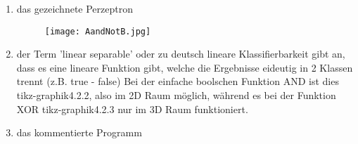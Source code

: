 \begin{enumerate}

	\item das gezeichnete Perzeptron
	\begin{figure}[h]
		\centering
		\texttt{[image: AandNotB.jpg]}
	\end{figure}

	\item der Term 'linear separable' oder zu deutsch lineare Klassifierbarkeit gibt an, dass es eine lineare Funktion gibt, welche die Ergebnisse eideutig in 2 Klassen trennt (z.B. true - false)
		Bei der einfache boolschen Funktion AND ist dies tikz-graphik4.2.2, also im 2D Raum möglich, während es bei der Funktion XOR tikz-graphik4.2.3 nur im 3D Raum funktioniert.

	\item das kommentierte Programm
	
\end{enumerate}
